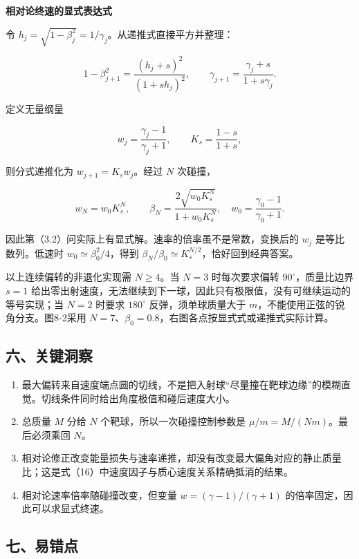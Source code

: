 \documentclass[12pt,a4paper,UTF8]{ctexart}
\newcommand{\tightlist}{\setlength{\itemsep}{0pt}\setlength{\parskip}{0pt}}
\begin{document}
\textbf{相对论终速的显式表达式}

令 \(h_j=\sqrt{1-\beta_j^2}=1/\gamma_j\)。从递推式直接平方并整理：

\[1-\beta_{j+1}^2
=\frac{(h_j+s)^2}{(1+sh_j)^2},
\qquad
\gamma_{j+1}=\frac{\gamma_j+s}{1+s\gamma_j}.\]

定义无量纲量

\[w_j=\frac{\gamma_j-1}{\gamma_j+1},\qquad
K_s=\frac{1-s}{1+s},\]

则分式递推化为 \(w_{j+1}=K_sw_j\)。经过 \(N\) 次碰撞，

\[w_N=w_0K_s^N,\qquad
\boxed{\beta_N=\frac{2\sqrt{w_0K_s^N}}{1+w_0K_s^N}},
\quad w_0=\frac{\gamma_0-1}{\gamma_0+1}.\]

因此第（3.2）问实际上有显式解。速率的倍率虽不是常数，变换后的 \(w_j\)
是等比数列。低速时 \(w_0\simeq\beta_0^2/4\)，得到
\(\beta_N/\beta_0\simeq K_s^{N/2}\)，恰好回到经典答案。

以上连续偏转的非退化实现需 \(N\ge4\)。当 \(N=3\) 时每次要求偏转
\(90^\circ\)，质量比边界 \(s=1\)
给出零出射速度，无法继续到下一球，因此只有极限值，没有可继续运动的等号实现；当
\(N=2\) 时要求 \(180^\circ\) 反弹，须单球质量大于
\(m\)，不能使用正弦的锐角分支。图8-2采用
\(N=7\)、\(\beta_0=0.8\)，右图各点按显式式或递推式实际计算。

\subsection{六、关键洞察}\label{ux516dux5173ux952eux6d1eux5bdf-7}

\begin{enumerate}
\def\labelenumi{\arabic{enumi}.}
\tightlist
\item
  最大偏转来自速度端点圆的切线，不是把入射球``尽量撞在靶球边缘''的模糊直觉。切线条件同时给出角度极值和碰后速度大小。
\item
  总质量 \(M\) 分给 \(N\) 个靶球，所以一次碰撞控制参数是
  \(\mu/m=M/(Nm)\)。最后必须乘回 \(N\)。
\item
  相对论修正改变能量损失与速率递推，却没有改变最大偏角对应的静止质量比；这是式（16）中速度因子与质心速度关系精确抵消的结果。
\item
  相对论速率倍率随碰撞改变，但变量 \(w=(\gamma-1)/(\gamma+1)\)
  的倍率固定，因此可以求显式终速。
\end{enumerate}

\subsection{七、易错点}\label{ux4e03ux6613ux9519ux70b9-7}
\end{document}
